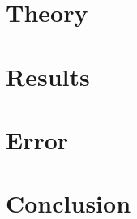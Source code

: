 \documentclass[aps, reprint,amsmath,amssymb]{revtex4-1} %
\begin{document}
\section{Theory}


\section{Results}


\section{Error}

\section{Conclusion}
\end{document}
